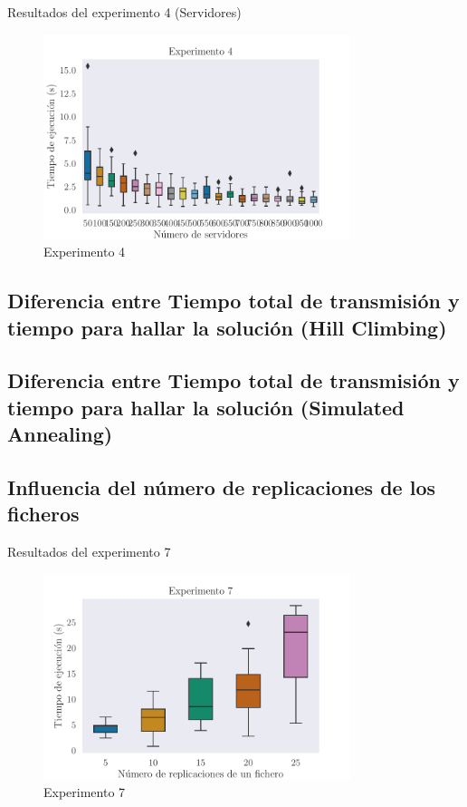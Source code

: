 \begin{table}[H]
    \centering
    
    \caption{Resultados del experimento 4 (Servidores)}%
    \label{tab:ex4s}
\end{table}

\begin{figure}[H]
\centering
\includegraphics[width=0.8\textwidth]{include/plots/ex4_s_time_bplot.pdf}
\caption{Experimento 4}%
\label{fig:ex4s}
\end{figure}

\subsection{Diferencia entre Tiempo total de transmisión y tiempo para hallar la solución (Hill Climbing)}

\subsection{Diferencia entre Tiempo total de transmisión y tiempo para hallar la solución (Simulated Annealing)}

\subsection{Influencia del número de replicaciones de los ficheros}

\begin{table}[H]
    \centering
    
    \caption{Resultados del experimento 7}%
    \label{tab:ex7}
\end{table}

\begin{figure}[H]
\centering
\includegraphics[width=0.8\textwidth]{include/plots/ex7_time_bplot.pdf}
\caption{Experimento 7}%
\label{fig:ex7time}
\end{figure}

